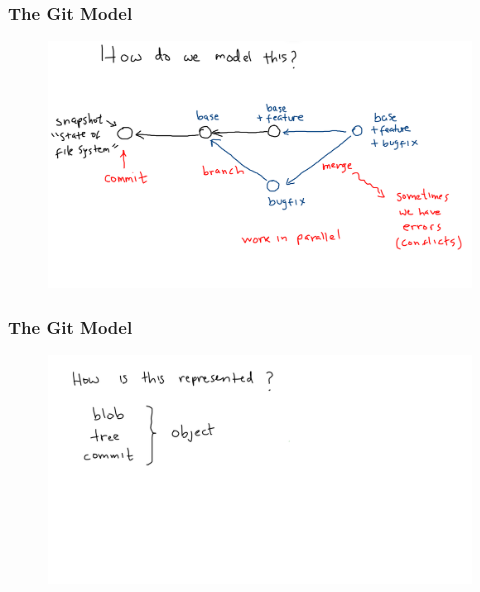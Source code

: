 \documentclass[11pt]{beamer}
\begin{document}
\begin{frame}[fragile]
\frametitle{The Git Model}

\begin{figure}[htp]
 \centering
 \includegraphics[scale=0.2]{git_model_2d.png}
\end{figure}

\end{frame}





\begin{frame}[fragile]
\frametitle{The Git Model}

\begin{figure}[htp]
 \centering
 \includegraphics[scale=0.2]{git_model_3a.png}
\end{figure}

\end{frame}



\end{document}
